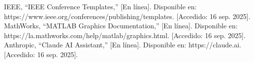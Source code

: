 \documentclass[journal]{IEEEtran} %
\begin{document}




\begin{thebibliography}{00}
     IEEE, ``IEEE Conference Templates,'' [En línea]. Disponible en: https://www.ieee.org/conferences/publishing/templates. [Accedido: 16 sep. 2025].
     MathWorks, ``MATLAB Graphics Documentation,'' [En línea]. Disponible en: https://la.mathworks.com/help/matlab/graphics.html. [Accedido: 16 sep. 2025].
     Anthropic, ``Claude AI Assistant,'' [En línea]. Disponible en: https://claude.ai. [Accedido: 16 sep. 2025].
\end{thebibliography}
\vspace{12pt}
\end{document}
